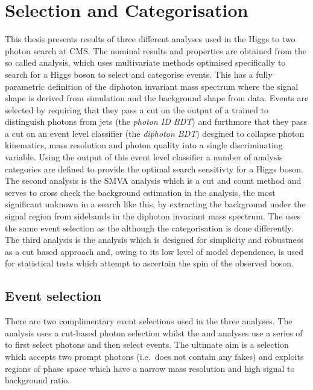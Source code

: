 \chapter{Selection and Categorisation}
\label{chap:selection_and_categorisation}

This thesis presents results of three different analyses used in the Higgs to two photon search at CMS. The nominal results and properties are obtained from the so called \MFM analysis, which uses multivariate methods optimised specifically to search for a \SM Higgs boson to select and categorise events. This has a fully parametric definition of the diphoton invariant mass spectrum where the signal shape is derived from \MC simulation and the background shape from data. Events are selected by requiring that they pass a cut on the output of a \BDT trained to distinguish photons from jets (the \textit{photon ID BDT}) and furthmore that they pass a cut on an event level classifier (the \textit{diphoton BDT}) desgined to collapse photon kinematics, mass resolution and photon quality into a single discriminating variable. Using the output of this event level classifier a number of analysis categories are defined to provide the optimal search sensitivty for a \SM Higgs boson. The second analysis is the \acf{SMVA} analysis which is a cut and count method and serves to cross check the background estimation in the \MFM analysis, the most significant unknown in a search like this, by extracting the background under the signal region from sidebands in the diphoton invariant mass spectrum. The \SMVA uses the same event selection as the \MFM although the categorisation is done differently. The third analysis is the \CiC analysis which is designed for simplicity and robustness as a cut based approach and, owing to its low level of model dependence, is used for statistical tests which attempt to ascertain the spin of the observed boson.

\section{Event selection}
\label{sec:event_selection}

There are two complimentary event selections used in the three analyses. The \CiC analysis uses a cut-based photon selection whilst the \MFM and \SMVA analyses use a series of \BDTs to first select photons and then select events. The ultimate aim is a selection which accepts two prompt photons (i.e.\ does not contain any fakes) and exploits regions of phase space which have a narrow mass resolution and high signal to background ratio.

